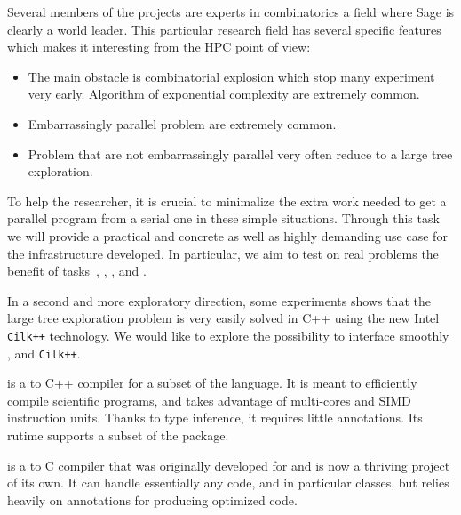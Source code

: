 \begin{workpackage}[id=hpc,wphases=36-48,
  title=High Performance Computing,
  PSRM=1, %
  LLRM=12, %
  SARM=1, %
  UKRM=1, %
  UBRM=1, %
  UJFRM=12]
\begin{tasklist}
\begin{task}[title=HPC infrastructure for combinatorics,id=hpc _combi]
  Several members of the projects are experts in combinatorics a field where
  Sage is clearly a world leader. This particular research field has several
  specific features which makes it interesting from the HPC point of view:
  \begin{itemize}
  \item The main obstacle is combinatorial explosion which stop many
    experiment very early. Algorithm of exponential complexity are extremely
    common.
  \item Embarrassingly parallel problem are extremely common.
  \item Problem that are not embarrassingly parallel very often reduce to a
    large tree exploration.
  \end{itemize}
  To help the researcher, it is crucial to minimalize the extra work needed to
  get a parallel program from a serial one in these simple situations. Through
  this task we will provide a practical and concrete as well as highly
  demanding use case for the infrastructure developed. In particular, we aim
  to test on real problems the benefit of tasks~,
  , ,
  and .

  In a second and more exploratory direction, some experiments shows that the
  large tree exploration problem is very easily solved in C++ using the new
  Intel \texttt{Cilk++} technology. We would like to explore the possibility to
  interface smoothly \Pythran, \Cython and \texttt{Cilk++}.
\end{task}

\begin{task}[title=Pythran-Cython convergence,id=pythran_cython]

  \Pythran is a \Python to C++ compiler for a subset of the \Python
  language. It is meant to efficiently compile scientific programs,
  and takes advantage of multi-cores and SIMD instruction units.
  Thanks to type inference, it requires little annotations. Its rutime
  supports a subset of the \Numpy package.

  \Cython is a \Python to C compiler that was originally developed for
  \Sage and is now a thriving project of its own. It can handle
  essentially any \Python code, and in particular classes, but relies
  heavily on annotations for producing optimized code.


\end{task}
\end{tasklist}
\end{workpackage}
